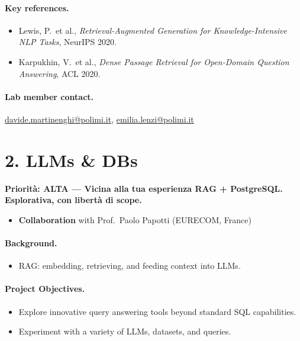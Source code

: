 \documentclass[a4paper,11pt]{article}
\newcommand{\priorita}[1]{%
  \par\smallskip\noindent\textbf{Priorit\`a: #1}\par\smallskip
}
\begin{document}
\paragraph{Key references.}
\begin{itemize}[nosep]
  \item Lewis, P.\ et al., \emph{Retrieval-Augmented Generation for Knowledge-Intensive NLP Tasks}, NeurIPS 2020.
  \item Karpukhin, V.\ et al., \emph{Dense Passage Retrieval for Open-Domain Question Answering}, ACL 2020.
\end{itemize}

\paragraph{Lab member contact.}
\url{davide.martinenghi@polimi.it}, \url{emilia.lenzi@polimi.it}


\section{2. LLMs \& DBs}

\priorita{ALTA --- Vicina alla tua esperienza RAG + PostgreSQL. Esplorativa, con libert\`a di scope.}

\begin{itemize}[nosep]
  \item \textbf{Collaboration} with Prof.\ Paolo Papotti (EURECOM, France)
\end{itemize}

\paragraph{Background.}
\begin{itemize}[nosep]
  \item RAG\@: embedding, retrieving, and feeding context into LLMs.
\end{itemize}

\paragraph{Project Objectives.}
\begin{itemize}[nosep]
  \item Explore innovative query answering tools beyond standard SQL capabilities.
  \item Experiment with a variety of LLMs, datasets, and queries.
\end{itemize}
\end{document}
